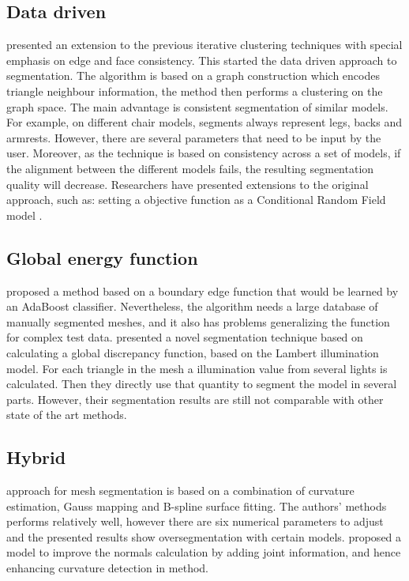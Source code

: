 \subsection{Data driven}

\cite{Golovinskiy2009} presented an extension to the previous iterative clustering techniques with special emphasis on edge and face consistency.
This started the data driven approach to segmentation.
The algorithm is based on a graph construction which encodes triangle neighbour information, the method then performs a clustering on the graph space.
The main advantage is consistent segmentation of similar models.
For example, on different chair models, segments always represent legs, backs and armrests. 
However, there are several parameters that need to be input by the user.
Moreover, as the technique is based on consistency across a set of models, if the alignment between the different models fails, the resulting segmentation quality will decrease.
Researchers have presented extensions to the original \cite{Golovinskiy2009} approach, such as: setting a objective function as a Conditional Random Field model \cite{Kalogerakis2010}.

\subsection{Global energy function}

\cite{Benhabiles2011} proposed a method based on a boundary edge function that would be learned by an AdaBoost classifier.
Nevertheless, the algorithm needs a large database of manually segmented meshes, and it also has problems generalizing the function for complex test data.
\cite{DeCastro2014} presented a novel segmentation technique based on calculating a global discrepancy function, based on the Lambert illumination model.
For each triangle in the mesh a illumination value from several lights is calculated.
Then they directly use that quantity to segment the model in several parts.
However, their segmentation results are still not comparable with other state of the art methods.

\subsection{Hybrid}

\cite{Wang2011} approach for mesh segmentation is based on a combination of curvature estimation, Gauss mapping and B-spline surface fitting.
The authors' methods performs relatively well, however there are six numerical parameters to adjust and the presented results show oversegmentation with certain models.
\cite{Yang2014} proposed a model to improve the normals calculation by adding joint information, and hence enhancing curvature detection in \cite{Wang2011} method.

